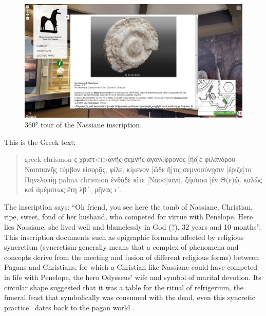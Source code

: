 \documentclass[amsthm,ebook]{saparticle}
\begin{document}
\begin{figure}[!bp]
\centering
 \includegraphics[width=\columnwidth]{EAGLE2016BONACINIPilotprojectatPaoloOrsiMuseum-img005.jpg}
\caption{360° tour of the Nassiane inscription.}
\label{fig:5}
\end{figure}


This is the Greek text: 

\begin{quotation}


\begin{otherlanguage*}{greek}
chrismon ς χριστ<ι>ανῆς σεμνῆς ἀγανóφρονος [ἠδ]ὲ φιλάνδρου Nασσιανῆς τύμβον εἰσορᾷς, φίλε, κίμενον [ὣδε ἥ]τις σεμνοσύνῃσιν [ἐριζε]το Πηνελοπίῃ palma chrismon ἐνθάδε κῖτε [Nασσ]ιανή, ζήσασα [ἐν Θ(ε)ῷ] καλῶς καὶ ἀμέμπτως ἒτη λβ´, μῆνας ι´.
\end{otherlanguage*}

\end{quotation}



The inscription says: ``Oh friend, you see here the tomb of Nassiane, Christian, ripe, sweet, fond of her husband, who
competed for virtue with Penelope. Here lies Nassiane, she lived well and blamelessly in God (?), 32 years and 10
months''. This inscription documents such as epigraphic formulas affected by religious syncretism (syncretism generally
means that a complex of phenomena and concepts derive from the meeting and fusion of different religious forms) between
Pagans and Christians, for which a Christian like Nassiane could have competed in life with Penelope, the hero
Odysseus’ wife and symbol of marital devotion. Its circular shape suggested that it was a table for the ritual of
refrigerium, the funeral feast that symbolically was consumed with the dead, even this syncretic practice \ dates back
to the pagan world \citep{Sgarlata2013;Scandurra2014}.
\end{document}
